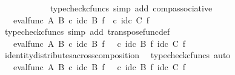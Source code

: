 \begin{isabellebody}
\ \ \ \ \ \ \ \ \ \ \isamarkupfalse%
\ {\isacharparenleft}{\kern0pt}typecheck{\isacharunderscore}{\kern0pt}cfuncs{\isacharcomma}{\kern0pt}\ simp\ add{\isacharcolon}{\kern0pt}\ comp{\isacharunderscore}{\kern0pt}associative{}{\isacharparenright}{\kern0pt}\isanewline
\ \ \ \ \ \ \ \ \isamarkupfalse%
\ \isamarkupfalse%
\ {\isachardoublequoteopen}{\isachardot}{\kern0pt}{\isachardot}{\kern0pt}{\isachardot}{\kern0pt}\ {\isacharequal}{\kern0pt}\ eval{\isacharunderscore}{\kern0pt}func\ A\ B\ {\isasymcirc}\isactrlsub c\ id\isactrlsub c\ B\ {\isasymtimes}\isactrlsub f\ {\isacharparenleft}{\kern0pt}{\isasymphi}\isactrlsup {\isasymsharp}\ {\isasymcirc}\isactrlsub c\ {\isacharparenleft}{\kern0pt}id\isactrlsub c\ C\ {\isasymtimes}\isactrlsub f\ {\isasympsi}\isactrlsup {\isasymsharp}{\isacharparenright}{\kern0pt}{\isacharparenright}{\kern0pt}{\isachardoublequoteclose}\isanewline
\ \ \ \ \ \ \ \ \ \ \isamarkupfalse%
\ {\isacharparenleft}{\kern0pt}typecheck{\isacharunderscore}{\kern0pt}cfuncs{\isacharcomma}{\kern0pt}\ simp\ add{\isacharcolon}{\kern0pt}\ transpose{\isacharunderscore}{\kern0pt}func{\isacharunderscore}{\kern0pt}def{\isacharparenright}{\kern0pt}\ \ \ \ \ \ \ \ \isanewline
\ \ \ \ \ \ \ \ \isamarkupfalse%
\ \isamarkupfalse%
\ {\isachardoublequoteopen}{\isachardot}{\kern0pt}{\isachardot}{\kern0pt}{\isachardot}{\kern0pt}\ {\isacharequal}{\kern0pt}\ eval{\isacharunderscore}{\kern0pt}func\ A\ B\ {\isasymcirc}\isactrlsub c\ {\isacharparenleft}{\kern0pt}{\isacharparenleft}{\kern0pt}id\isactrlsub c\ B\ {\isasymtimes}\isactrlsub f\ {\isasymphi}\isactrlsup {\isasymsharp}{\isacharparenright}{\kern0pt}\ \ {\isasymcirc}\isactrlsub c\ {\isacharparenleft}{\kern0pt}id\isactrlsub c\ B\ {\isasymtimes}\isactrlsub f\ {\isacharparenleft}{\kern0pt}id\isactrlsub c\ C\ {\isasymtimes}\isactrlsub f\ {\isasympsi}\isactrlsup {\isasymsharp}{\isacharparenright}{\kern0pt}{\isacharparenright}{\kern0pt}{\isacharparenright}{\kern0pt}{\isachardoublequoteclose}\isanewline
\ \ \ \ \ \ \ \ \ \ \isamarkupfalse%
\ identity{\isacharunderscore}{\kern0pt}distributes{\isacharunderscore}{\kern0pt}across{\isacharunderscore}{\kern0pt}composition\ \isamarkupfalse%
\ {\isacharparenleft}{\kern0pt}typecheck{\isacharunderscore}{\kern0pt}cfuncs{\isacharcomma}{\kern0pt}\ auto{\isacharparenright}{\kern0pt}\isanewline
\ \ \ \ \ \ \ \ \isamarkupfalse%
\ \isamarkupfalse%
\ {\isachardoublequoteopen}{\isachardot}{\kern0pt}{\isachardot}{\kern0pt}{\isachardot}{\kern0pt}\ {\isacharequal}{\kern0pt}\ {\isacharparenleft}{\kern0pt}eval{\isacharunderscore}{\kern0pt}func\ A\ B\ {\isasymcirc}\isactrlsub c\ {\isacharparenleft}{\kern0pt}{\isacharparenleft}{\kern0pt}id\isactrlsub c\ B\ {\isasymtimes}\isactrlsub f\ {\isasymphi}\isactrlsup {\isasymsharp}{\isacharparenright}{\kern0pt}{\isacharparenright}{\kern0pt}{\isacharparenright}{\kern0pt}\ \ {\isasymcirc}\isactrlsub c\ {\isacharparenleft}{\kern0pt}id\isactrlsub c\ B\ {\isasymtimes}\isactrlsub f\ {\isacharparenleft}{\kern0pt}id\isactrlsub c\ C\ {\isasymtimes}\isactrlsub f\ {\isasympsi}\isactrlsup {\isasymsharp}{\isacharparenright}{\kern0pt}{\isacharparenright}{\kern0pt}{\isachardoublequoteclose}\isanewline

\end{isabellebody}

